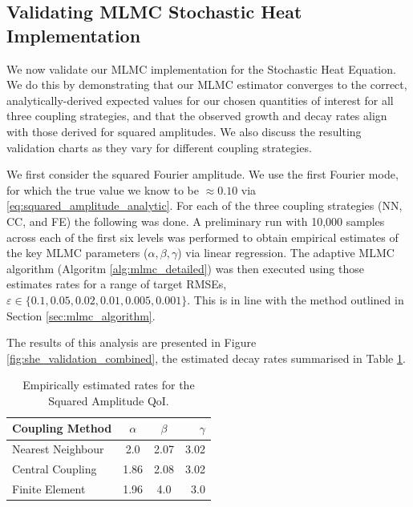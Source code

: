 \subsection{Validating MLMC Stochastic Heat Implementation}\label{sec:stoch_heat_validation}

We now validate our MLMC implementation for the Stochastic Heat Equation.
We do this by demonstrating that our MLMC estimator converges to the correct, 
analytically-derived expected values for our chosen quantities of interest for
all three coupling strategies, and that the observed 
growth and decay rates align with those derived for squared amplitudes. 
We also discuss the resulting validation charts as they vary for different coupling 
strategies.

We first consider the squared Fourier amplitude. We use the first Fourier mode, 
for which the true value we know to 
be $\approx 0.10$
via \eqref{eq:squared_amplitude_analytic}.
For each of the three coupling strategies (NN, CC, and FE) the following was done. 
A preliminary run with 10,000 samples across each of 
the first six levels was performed to obtain 
empirical estimates of the key MLMC 
parameters ($\alpha, \beta, \gamma$) via linear regression. 
The adaptive MLMC algorithm (Algoritm \ref{alg:mlmc_detailed}) was then 
executed using those estimates rates for a range of 
target RMSEs, $\varepsilon \in \{0.1, 0.05, 0.02, 0.01, 0.005, 0.001\}$. This is in line with the 
method outlined in Section
\ref{sec:mlmc_algorithm}.

The results of this analysis are presented in Figure \ref{fig:she_validation_combined}, 
the estimated decay rates summarised in Table \ref{tab:she_decay_rates}.

\begin{table}[htbp]
    \centering
    \begin{tabular}{|l|c|c|r|}
        \hline
        \textbf{Coupling Method} & \textbf{$\alpha$} & \textbf{$\beta$} & \textbf{$\gamma$} \\
        \hline
        Nearest Neighbour & 2.0 & 2.07 & 3.02\\
        Central Coupling & 1.86 & 2.08 & 3.02 \\
        Finite Element & 1.96 & 4.0 & 3.0 \\
        \hline
    \end{tabular}
    \caption{Empirically estimated rates for the Squared Amplitude QoI.}
    \label{tab:she_decay_rates}
\end{table}


